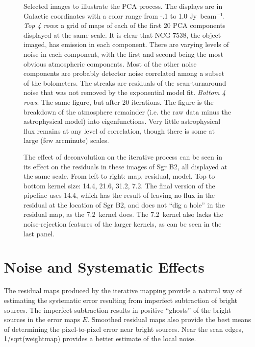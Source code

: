 \documentclass[12pt,preprint]{aastex}
\newcommand\jyb{Jy~beam$^{-1}$}
\def\Figure#1#2#3#4{
\begin{figure}[htb]
\epsscale{#4}
\plotone{#1}
\caption{#2}
\label{#3}
\end{figure}
}
\begin{document}
\begin{figure}
\begin{minipage}{6.5in}
  \end{minipage}
  \caption{Selected images to illustrate the PCA process.  The displays are in
  Galactic coordinates with a color range from -.1 to 1.0 \jyb.
  {\it Top 4 rows}: a grid of maps of each of the first 20 PCA components displayed at
  the same scale.  It is clear that NCG 7538, the object imaged, has emission
  in each component.  There are varying levels of noise in each component, with
  the first and second being the most obvious atmospheric components.  Most of
  the other noise components are probably detector noise correlated among a
  subset of the bolometers.  The streaks are residuals of the scan-turnaround
  noise that was not removed by the exponential model fit.  {\it Bottom 4
  rows}: The same figure, but after 20 iterations.  The figure is the breakdown
  of the atmosphere remainder (i.e.  the raw data minus the astrophysical
  model) into eigenfunctions.  Very little astrophysical flux remains at any
  level of correlation, though there is some at large (few arcminute) scales.}
\label{fig:PCA_Graphical}

\end{figure}

\Figure{l001_deconvolutionkernelcompare}{The effect of deconvolution on the
iterative process can be seen in its effect on the residuals in these images of
Sgr B2, all displayed at the same scale. From left to right: map, residual,
model. Top to bottom kernel size: 14.4\arcsec, 21.6\arcsec, 31.2\arcsec,
7.2\arcsec. The final version of the pipeline uses 14.4\arcsec, which has the
result of leaving no flux in the residual at the location of Sgr B2, and does
not ``dig a hole'' in the residual map, as the 7.2\arcsec\ kernel does.  The
7.2\arcsec\ kernel also lacks the noise-rejection features of the larger
kernels, as can be seen in the last panel.}{fig:Deconvolution}{1.0}

\clearpage

\section{Noise and Systematic Effects}
\label{sec:Noise}

The residual maps produced by the iterative mapping provide a natural way of
estimating the systematic error resulting from imperfect subtraction of bright
sources.  The imperfect subtraction results in positive ``ghosts'' of the
bright sources in the error maps $E$.  Smoothed residual maps also provide the
best means of determining the pixel-to-pixel error near bright sources.  Near
the scan edges, 1/sqrt(weightmap) provides a better estimate of the local noise.
\end{document}

